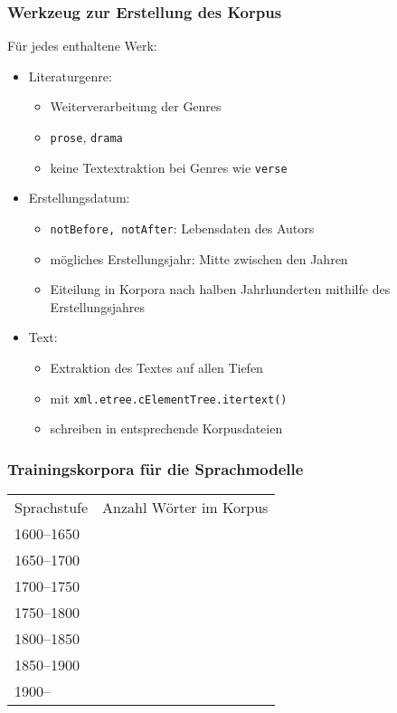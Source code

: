 \documentclass[t]{beamer} %
\begin{document}
\begin{frame}
  \frametitle{Werkzeug zur Erstellung des Korpus}
  Für jedes enthaltene Werk:
  
  \begin{itemize}
  \item Literaturgenre:
    \begin{itemize}
    \item Weiterverarbeitung der Genres \item \texttt{prose}, \texttt{drama} 
    \item keine Textextraktion bei Genres wie \texttt{verse}
    \end{itemize}
    \vspace*{1ex}
    \pause

  \item Erstellungsdatum:
    \begin{itemize}
    \item \texttt{notBefore, notAfter}: Lebensdaten des Autors
    \item mögliches Erstellungsjahr: Mitte zwischen den Jahren 
    \item Eiteilung in Korpora nach halben Jahrhunderten mithilfe des Erstellungsjahres
    \end{itemize}
    \vspace*{1ex}
    \pause
    
  \item Text:
    \begin{itemize}
    \item Extraktion des Textes auf allen Tiefen
    \item mit \texttt{xml.etree.cElementTree.itertext()}
    \item schreiben in entsprechende Korpusdateien
    \end{itemize}
  \end{itemize}
\end{frame}

\begin{frame}
  \frametitle{Trainingskorpora für die Sprachmodelle}
  \begin{tabular}{ll}
  Sprachstufe & Anzahl Wörter im Korpus
  \vspace*{1ex}\\
  1600--1650 & \\
  1650--1700 & \\
  1700--1750 & \\
  1750--1800 & \\
  1800--1850 & \\
  1850--1900 & \\
  1900--     & 
  \end{tabular}
\end{frame}
\end{document}
